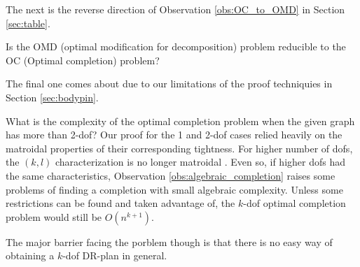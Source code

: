 The next is the reverse direction of Observation \ref{obs:OC_to_OMD} in Section \ref{sec:table}.

\begin{openproblem}
    Is the OMD (optimal modification for decomposition) problem
    reducible to the OC (Optimal completion) problem?
\end{openproblem}

The final one comes about due to our limitations of the proof techniquies in Section \ref{sec:bodypin}.

\begin{openproblem}
    What is the complexity of the optimal completion problem when the given graph has more than 2-dof? Our proof for the 1 and 2-dof cases relied heavily on the matroidal properties of their corresponding tightness. For higher number of dofs, the $(k,l)$ characterization is no longer matroidal \cite{Lee:2007:PGA}. Even so, if higher dofs had the same characteristics, Observation \ref{obs:algebraic_completion} raises some problems of finding a completion with small algebraic complexity. Unless some restrictions can be found and taken advantage of, the $k$-dof optimal completion problem would still be $O(n^{k+1})$.

    The major barrier facing the porblem though is that there is no easy way of obtaining a $k$-dof DR-plan in general.
\end{openproblem}


